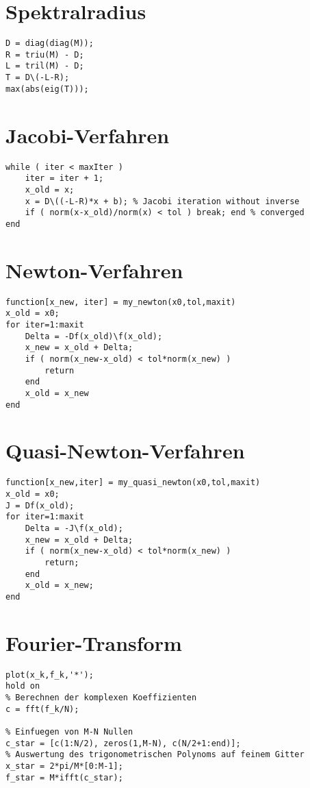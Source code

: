 
\section{Spektralradius}
	\begin{lstlisting}[style=list]
D = diag(diag(M));
R = triu(M) - D;
L = tril(M) - D;
T = D\(-L-R);
max(abs(eig(T)));
	\end{lstlisting}

\section{Jacobi-Verfahren} 
	\begin{lstlisting}[style=list]
while ( iter < maxIter )
	iter = iter + 1;
	x_old = x;
	x = D\((-L-R)*x + b); % Jacobi iteration without inverse
	if ( norm(x-x_old)/norm(x) < tol ) break; end % converged
end
	\end{lstlisting}

\section{Newton-Verfahren} 
	\begin{lstlisting}[style=list]
function[x_new, iter] = my_newton(x0,tol,maxit)
x_old = x0;
for iter=1:maxit
	Delta = -Df(x_old)\f(x_old);
	x_new = x_old + Delta;
	if ( norm(x_new-x_old) < tol*norm(x_new) )
		return
	end
	x_old = x_new
end
	\end{lstlisting}
	
\section{Quasi-Newton-Verfahren} 
	\begin{lstlisting}[style=list]
function[x_new,iter] = my_quasi_newton(x0,tol,maxit)
x_old = x0;
J = Df(x_old);
for iter=1:maxit
	Delta = -J\f(x_old);
	x_new = x_old + Delta;
	if ( norm(x_new-x_old) < tol*norm(x_new) )
		return;
	end
	x_old = x_new;
end
	\end{lstlisting}

\section{Fourier-Transform} 
	\begin{lstlisting}[style=list]
% Plotten der diskreten Funktionswerte
plot(x_k,f_k,'*');
hold on
% Berechnen der komplexen Koeffizienten
c = fft(f_k/N);

% Einfuegen von M-N Nullen
c_star = [c(1:N/2), zeros(1,M-N), c(N/2+1:end)];
% Auswertung des trigonometrischen Polynoms auf feinem Gitter
x_star = 2*pi/M*[0:M-1];
f_star = M*ifft(c_star);
	\end{lstlisting}


